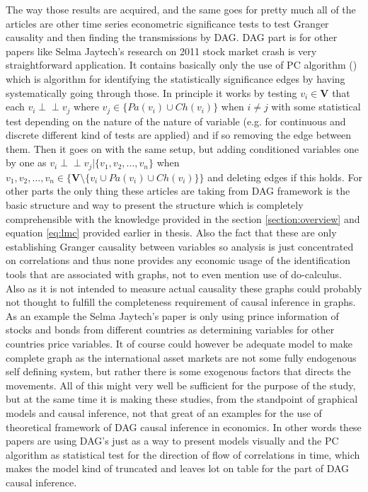 \documentclass[main=english,12pt,a4paper,pdftex,econ,utf8]{aaltothesis}
\newcommand{\indep}{\perp \!\!\! \perp}
\newcommand{\ch}[1]{Ch(#1)}
\newcommand{\pa}[1]{Pa(#1)}
\newcommand{\vars}{\bm{V}}
\begin{document}
The way those results are acquired, and the same goes for pretty much all of the articles are other time series econometric significance tests to test Granger causality and then finding the transmissions by DAG. DAG part is for other papers like Selma Jaytech's research on 2011 stock market crash is very straightforward application. It contains basically only the use of PC algorithm (\cite{Spirtes2000}) which is algorithm for identifying the statistically significance edges by having systematically going through those. In principle it works by testing $v_{i}\in\vars$ that each $v_{i}\indep v_{j}$ where $v_{j}\in\{\pa{v_{i}}\cup\ch{v_{i}}\}$ when $i\neq j$ with some statistical test depending on the nature of the nature of variable (e.g. for continuous and discrete different kind of tests are applied) and if so removing the edge between them. Then it goes on with the same setup, but adding conditioned variables one by one as $v_{i}\indep v_{j}|\{v_{1},v_{2},\ldots,v_{n}\}$ when $v_{1},v_{2},\ldots,v_{n}\in\{\vars\setminus\{v_{i}\cup\pa{v_{i}}\cup\ch{v_{i}}\}\}$ and deleting edges if this holds. For other parts the only thing these articles are taking from DAG framework is the basic structure and way to present the structure which is completely comprehensible with the knowledge provided in the section \ref{section:overview} and equation \ref{eq:lmc} provided earlier in thesis.
Also the fact that these are only establishing Granger causality between variables so analysis is just concentrated on correlations and thus none provides any economic usage of the identification tools that are associated with graphs, not to even mention use of do-calculus. Also as it is not intended to measure actual causality these graphs could probably not thought to fulfill the completeness requirement of causal inference in graphs. As an example the Selma Jaytech's paper is only using prince information of stocks and bonds from different countries as determining variables for other countries price variables. It of course could however be adequate model to make complete graph as the international asset markets are not some fully endogenous self defining system, but rather there is some exogenous factors that directs the movements. All of this might very well be sufficient for the purpose of the study, but at the same time it is making these studies, from the standpoint of graphical models and causal inference, not that great of an examples for the use of theoretical framework of DAG causal inference in economics. In other words these papers are using DAG's just as a way to present models visually and the PC algorithm as statistical test for the direction of flow of correlations in time, which makes the model kind of truncated and leaves lot on table for the part of DAG causal inference.
\end{document}
